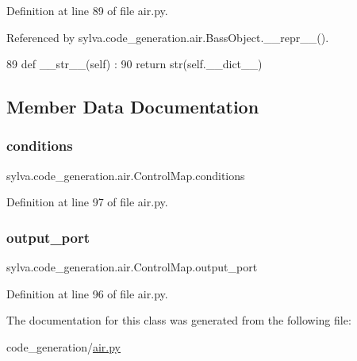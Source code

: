 Definition at line 89 of file air.\+py.



Referenced by sylva.\+code\+\_\+generation.\+air.\+Bass\+Object.\+\_\+\+\_\+repr\+\_\+\+\_\+().


\begin{DoxyCode}
89   \textcolor{keyword}{def }\_\_str\_\_(self) :
90     \textcolor{keywordflow}{return} str(self.\_\_dict\_\_)
\end{DoxyCode}


\subsection{Member Data Documentation}
\mbox{\label{classsylva_1_1code__generation_1_1air_1_1_control_map_ada7c102a2016403651c51193ba94dbc7}} 
\subsubsection{\texorpdfstring{conditions}{conditions}}
{\footnotesize\ttfamily sylva.\+code\+\_\+generation.\+air.\+Control\+Map.\+conditions}



Definition at line 97 of file air.\+py.

\mbox{\label{classsylva_1_1code__generation_1_1air_1_1_control_map_ab1eb2dd172ed3e35b4d93645aca8b340}} 
\subsubsection{\texorpdfstring{output\+\_\+port}{output\_port}}
{\footnotesize\ttfamily sylva.\+code\+\_\+generation.\+air.\+Control\+Map.\+output\+\_\+port}



Definition at line 96 of file air.\+py.



The documentation for this class was generated from the following file\+:\begin{DoxyCompactItemize}
\item 
code\+\_\+generation/\hyperlink{air_8py}{air.\+py}\end{DoxyCompactItemize}
